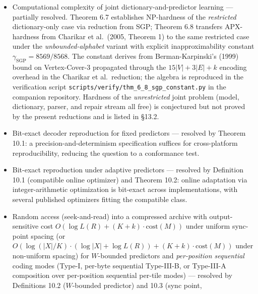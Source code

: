 \documentclass[
]{article}
\begin{document}
\begin{itemize}
  (\texttt{scripts/verify/thm\_6\_6b\_typeiiic\_achievability.py})
  exhibits the per-symbol gap $\to 0$ at the predicted
  $O(\log\log N/\log N)$ rate on order-1 Markov sources and confirms the
  re-index is rate-neutral to machine precision. The companion question
  --- whether the \emph{specific} greedy marginal-MDL builder of
  Theorem 6.5 is itself a universal (irreducible) transform --- is
  \emph{not} resolved and is listed in §13.2.
\item
  Computational complexity of joint dictionary-and-predictor
  learning --- partially resolved. Theorem 6.7 establishes
  NP-hardness of the \emph{restricted} dictionary-only case via
  reduction from SGP; Theorem 6.8 transfers APX-hardness from
  Charikar et al.\ (2005, Theorem 1) to the same restricted case
  under the \emph{unbounded-alphabet} variant with explicit
  inapproximability constant $\gamma_{\mathrm{SGP}} = 8569/8568$.
  The constant derives from Berman-Karpinski's (1999) bound on
  Vertex-Cover-3 propagated through the $15|V|+3|E|+k$ encoding
  overhead in the Charikar et al.\ reduction; the algebra is
  reproduced in the verification script
  \texttt{scripts/verify/thm\_6\_8\_sgp\_constant.py} in the
  companion repository. Hardness of the \emph{unrestricted}
  joint problem (model, dictionary, parser, and repair stream all
  free) is conjectured but not proved by the present reductions
  and is listed in §13.2.
\item
  Bit-exact decoder reproduction for fixed predictors --- resolved
  by Theorem 10.1: a precision-and-determinism specification
  suffices for cross-platform reproducibility, reducing the question
  to a conformance test.
\item
  Bit-exact reproduction under adaptive predictors --- resolved by
  Definition 10.1 (compatible online optimizer) and Theorem 10.2:
  online adaptation via integer-arithmetic optimization is bit-exact
  across implementations, with several published optimizers fitting
  the compatible class.
\item
  Random access (seek-and-read) into a compressed archive with
  output-sensitive cost $O(\log L(R) + (K + k) \cdot
  \mathrm{cost}(M))$ under uniform sync-point spacing (or
  $O(\log(|X|/K) \cdot (\log |X| + \log L(R)) + (K + k) \cdot \mathrm{cost}(M))$
  under non-uniform spacing) for $W$-bounded predictors and
  \emph{per-position sequential} coding modes (Type-I, per-byte
  sequential Type-III-B, or Type-III-A composition over
  per-position sequential per-tile modes) --- resolved by
  Definitions 10.2 ($W$-bounded predictor) and 10.3 (sync point,

\end{itemize}
\end{document}
